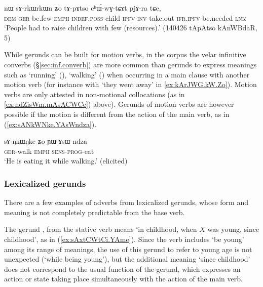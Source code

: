 \begin{exe}
\ex \label{ex:sArkWrkWn.chWwGtCAt}
\gll nɯ sɤ-rkɯ\redp{}rkɯn ʑo tɤ-pɤtso cʰɯ́-wɣ-tɕɤt pjɤ-ra tɕe, \\
\textsc{dem} \textsc{ger}-be.few \textsc{emph} \textsc{indef}.\textsc{poss}-child \textsc{ipfv}-\textsc{inv}-take.out \textsc{ifr}.\textsc{ipfv}-be.needed \textsc{lnk} \\ 
\glt `People had to raise children with few (resources).' (140426 tApAtso kAnWBdaR, 5)
\end{exe}

While gerunds can be built for motion verbs, in the corpus the velar infinitive converbs  (§\ref{sec:inf.converb}) are more common than gerunds to express meanings such as `running' (), `walking' () when occurring in a main clause with another motion verb (for instance with  `they went away' in \ref{ex:kArJWG.kW.Zo}). Motion verbs are only attested in non-motional collocations (as in \ref{ex:ndZisWm.mAsACWCe}) above). Gerunds of motion verbs are however possible if the motion is different from the action of the main verb, as in (\ref{ex:sANkWNke.YAsWndza}).

\begin{exe}
\ex \label{ex:sANkWNke.YAsWndza}
\gll sɤ-ŋkɯ\redp{}ŋke ʑo ɲɯ-ɤsɯ-ndza \\
\textsc{ger}-walk \textsc{emph} \textsc{sens}-\textsc{prog}-eat \\
\glt `He is eating it while walking.' (elicited)
\end{exe}

\subsubsection{Lexicalized gerunds}  \label{sec:gerund.lexicalized}
There are a few examples of adverbs from lexicalized gerunds, whose form and meaning is not completely predictable from the base verb.

The gerund , from the stative verb  means `in childhood, when $X$ was young, since childhood', as in (\ref{ex:sAxtCWtCi.YAme}). Since the verb  includes `be young' among its range of meanings, the use of this gerund to refer to young age is not unexpected (`while being young'), but the additional meaning `since  childhood' does not correspond to the usual function of the gerund, which expresses an action or state taking place simultaneously with the action of the main verb.

